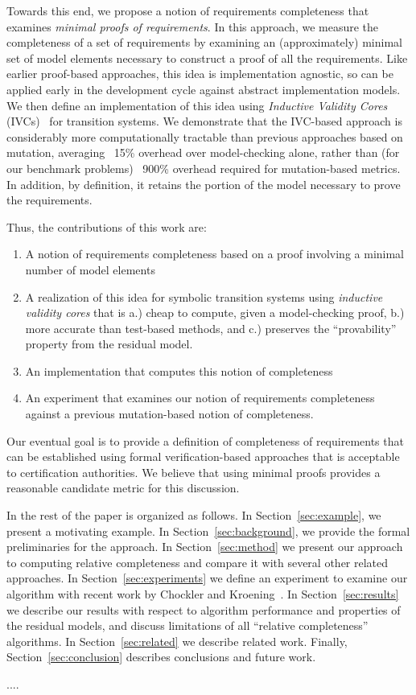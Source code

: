 \noindent Towards this end, we propose a notion of requirements completeness that examines {\em minimal proofs of requirements}.  In this approach, we measure the completeness of a set of requirements by examining an (approximately) minimal set of model elements necessary to construct a proof of all the requirements.  Like earlier proof-based approaches, this idea is implementation agnostic, so can be applied early in the development cycle against abstract implementation models.  We then define an implementation of this idea using {\em Inductive Validity Cores} (IVCs)~\cite{Ghass16} for transition systems.  We demonstrate that the IVC-based approach is considerably more computationally tractable than previous approaches based on mutation, averaging ~15\% overhead over model-checking alone, rather than (for our benchmark problems) ~900\% overhead required for mutation-based metrics.  In addition, by definition, it retains the portion of the model necessary to prove the requirements.

Thus, the contributions of this work are:
\begin{enumerate}
\item A notion of requirements completeness based on a proof involving a minimal number of model elements
\item A realization of this idea for symbolic transition systems using {\em inductive validity cores} that is a.) cheap to compute, given a model-checking proof, b.) more accurate than test-based methods, and c.) preserves the ``provability'' property from the residual model.
\item An implementation that computes this notion of completeness
\item An experiment that examines our notion of requirements completeness against a previous mutation-based notion of completeness.
\end{enumerate}

\noindent Our eventual goal is to provide a definition of completeness of requirements that can be established using formal verification-based approaches that is acceptable to certification authorities.  We believe that using minimal proofs provides a reasonable candidate metric for this discussion.


In the rest of the paper is organized as follows.  In Section~\ref{sec:example}, we present a motivating example.  In Section~\ref{sec:background}, we provide the formal preliminaries for the approach.  In Section~\ref{sec:method} we present our approach to computing relative completeness and compare it with several other related approaches.  In Section~\ref{sec:experiments} we define an experiment to examine our algorithm with recent work by Chockler and Kroening~\cite{chockler2010coverage}.  In Section~\ref{sec:results} we describe our results with respect to algorithm performance and properties of the residual models, and discuss limitations of all ``relative completeness'' algorithms.  In Section~\ref{sec:related} we describe related work.  Finally, Section~\ref{sec:conclusion} describes conclusions and future work.


....

